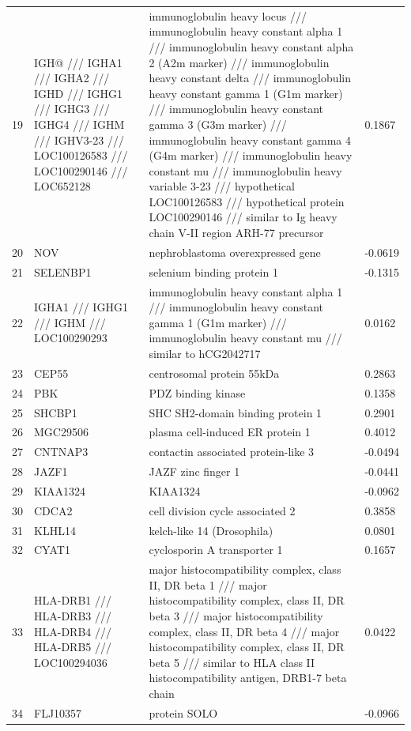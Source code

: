 \documentclass{article}
\begin{document}
\begin{longtable}{| l | p{4cm} | p{8cm} | l |}
  19 & IGH@ /// IGHA1 /// IGHA2 /// IGHD /// IGHG1 /// IGHG3 /// IGHG4 /// IGHM /// IGHV3-23 /// LOC100126583 /// LOC100290146 /// LOC652128 & immunoglobulin heavy locus /// immunoglobulin heavy constant alpha 1 /// immunoglobulin heavy constant alpha 2 (A2m marker) /// immunoglobulin heavy constant delta /// immunoglobulin heavy constant gamma 1 (G1m marker) /// immunoglobulin heavy constant gamma 3 (G3m marker) /// immunoglobulin heavy constant gamma 4 (G4m marker) /// immunoglobulin heavy constant mu /// immunoglobulin heavy variable 3-23 /// hypothetical LOC100126583 /// hypothetical protein LOC100290146 /// similar to Ig heavy chain V-II region ARH-77 precursor & 0.1867 \\ 
  20 & NOV & nephroblastoma overexpressed gene & -0.0619 \\ 
  21 & SELENBP1 & selenium binding protein 1 & -0.1315 \\ 
  22 & IGHA1 /// IGHG1 /// IGHM /// LOC100290293 & immunoglobulin heavy constant alpha 1 /// immunoglobulin heavy constant gamma 1 (G1m marker) /// immunoglobulin heavy constant mu /// similar to hCG2042717 & 0.0162 \\ 
  23 & CEP55 & centrosomal protein 55kDa & 0.2863 \\ 
  24 & PBK & PDZ binding kinase & 0.1358 \\ 
  25 & SHCBP1 & SHC SH2-domain binding protein 1 & 0.2901 \\ 
  26 & MGC29506 & plasma cell-induced ER protein 1 & 0.4012 \\ 
  27 & CNTNAP3 & contactin associated protein-like 3 & -0.0494 \\ 
  28 & JAZF1 & JAZF zinc finger 1 & -0.0441 \\ 
  29 & KIAA1324 & KIAA1324 & -0.0962 \\ 
  30 & CDCA2 & cell division cycle associated 2 & 0.3858 \\ 
  31 & KLHL14 & kelch-like 14 (Drosophila) & 0.0801 \\ 
  32 & CYAT1 & cyclosporin A transporter 1 & 0.1657 \\ 
  33 & HLA-DRB1 /// HLA-DRB3 /// HLA-DRB4 /// HLA-DRB5 /// LOC100294036 & major histocompatibility complex, class II, DR beta 1 /// major histocompatibility complex, class II, DR beta 3 /// major histocompatibility complex, class II, DR beta 4 /// major histocompatibility complex, class II, DR beta 5 /// similar to HLA class II histocompatibility antigen, DRB1-7 beta chain & 0.0422 \\ 
  34 & FLJ10357 & protein SOLO & -0.0966 \\ 
   \hline
\end{longtable}
\end{document}
